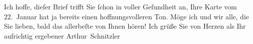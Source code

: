 \pstart
           Ich hoffe, dieſer Brief trifft Sie ſchon in voller Geſundheit an, Ihre Karte vom
                  22. Januar hat ja bereits einen hoffnungsvolleren Ton. Möge ich und
               wir alle, die Sie lieben, bald das allerbeſte von Ihnen hören!\pend
           \pstart Ich grüße Sie von Herzen als Ihr aufrichtig ergebener \spacefill\mbox{Arthur
                  Schnitzler}\pend{}\endnumbering{}  
      